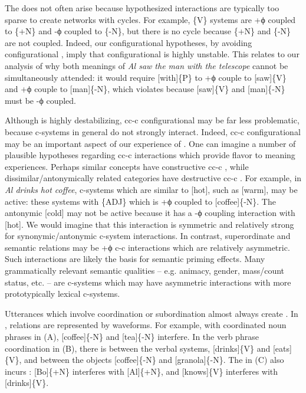   The  does not often arise because hypothesized  interactions are typically too sparse to create networks with cycles. For example,  \{V\} systems are +ϕ coupled to \{+N\} and -ϕ coupled to \{-N\}, but there is no cycle because \{+N\} and \{-N\} are not coupled. Indeed, our configurational hypotheses, by avoiding configurational , imply that configurational  is highly unstable. This relates to our analysis of why both meanings of \textit{Al saw the man with the telescope} cannot be simultaneously attended: it would require [with]\{P\} to +ϕ couple to [saw]\{V\} and +ϕ couple to [man]\{-N\}, which violates  because [saw]\{V\} and [man]\{-N\} must be -ϕ coupled. 

  Although  is highly destabilizing, cc-c configurational  may be far less problematic, because c-systems in general do not strongly interact. Indeed, cc-c configurational  may be an important aspect of our experience of . One can imagine a number of plausible hypotheses regarding cc-c interactions which provide flavor to meaning experiences. Perhaps similar concepts have constructive cc-c , while dissimilar/antonymically related categories have destructive cc-c . For example, in \textit{Al drinks hot coffee}, c-systems which are similar to [hot], such as [warm], may be active: these systems  with \{\textsc{ADJ}\} which is +ϕ coupled to [coffee]\{-N\}. The antonymic [cold] may not be active because it has a -ϕ coupling interaction with [hot]. We would imagine that this interaction is symmetric and relatively strong for synonymic/antonymic c-system interactions. In contrast, superordinate and  semantic relations may be +ϕ c-c interactions which are relatively asymmetric. Such interactions are likely the basis for semantic priming effects. Many grammatically relevant semantic qualities -- e.g. animacy, gender, mass/count status, etc. -- are c-systems which may have asymmetric interactions with more prototypically lexical c-systems.

  Utterances which involve coordination or subordination almost always create  . In {},  relations are represented by waveforms. For example, with coordinated noun phrases in (A), [coffee]\{-N\} and [tea]\{-N\} interfere. In the verb phrase coordination in (B), there is  between the verbal systems, [drinks]\{V\} and [eats]\{V\}, and between the objects [coffee]\{-N\} and [granola]\{-N\}. The  in (C) also incurs : [Bo]\{+N\} interferes with [Al]\{+N\}, and [knows]\{V\} interferes with [drinks]\{V\}.

